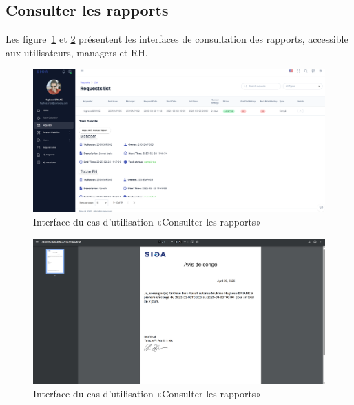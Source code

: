\subsection{Consulter les rapports}
Les figure~\ref{fig:consult_reports} et \ref{fig:consult_reports1} présentent les interfaces de consultation des rapports, accessible aux utilisateurs, managers et RH. \\
\begin{figure}[h]
    \centering
    \includegraphics[width=14cm]{images/realisation/consult_reports.png}
    \caption{Interface du cas d'utilisation «Consulter les rapports»}
    \label{fig:consult_reports}
\end{figure}
\begin{figure}[h]
    \centering
    \includegraphics[width=16cm]{images/realisation/consult_reports1.png}
    \caption{Interface du cas d'utilisation «Consulter les rapports»}
    \label{fig:consult_reports1}
\end{figure}
